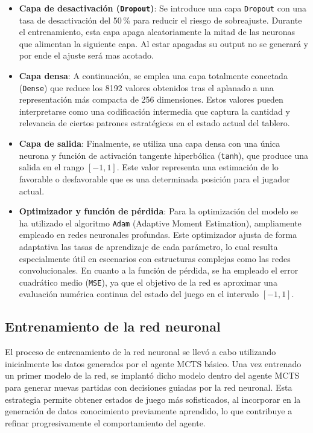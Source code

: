 \documentclass[conference]{IEEEtran}
\begin{document}
\begin{itemize}
\item \textbf{Capa de desactivación (\texttt{Dropout})}: Se introduce una capa \texttt{Dropout} con una tasa de desactivación del 50\,\% para reducir el riesgo de sobreajuste. Durante el entrenamiento, esta capa apaga aleatoriamente la mitad de las neuronas que alimentan la siguiente capa. Al estar apagadas su output no se generará y por ende el ajuste será mas acotado.

\item \textbf{Capa densa}: A continuación, se emplea una capa totalmente conectada (\texttt{Dense}) que reduce los 8192 valores obtenidos tras el aplanado a una representación más compacta de 256 dimensiones. Estos valores pueden interpretarse como una codificación intermedia que captura la cantidad y relevancia de ciertos patrones estratégicos en el estado actual del tablero.

\item \textbf{Capa de salida}\cite{rusin2020}: Finalmente, se utiliza una capa densa con una única neurona y función de activación tangente hiperbólica (\texttt{tanh}), que produce una salida en el rango $[-1, 1]$. Este valor representa una estimación de lo favorable o desfavorable que es una determinada posición para el jugador actual.

    \item \textbf{Optimizador y función de pérdida}: Para la optimización del modelo se ha utilizado el algoritmo \texttt{Adam} (Adaptive Moment Estimation)\cite{rusin2020}, ampliamente empleado en redes neuronales profundas. Este optimizador ajusta de forma adaptativa las tasas de aprendizaje de cada parámetro, lo cual resulta especialmente útil en escenarios con estructuras complejas como las redes convolucionales. En cuanto a la función de pérdida, se ha empleado el error cuadrático medio (\texttt{MSE}), ya que el objetivo de la red es aproximar una evaluación numérica continua del estado del juego en el intervalo $[-1, 1]$.
\end{itemize}


\subsection{Entrenamiento de la red neuronal}

El proceso de entrenamiento de la red neuronal se llevó a cabo utilizando inicialmente los datos generados por el agente MCTS básico. Una vez entrenado un primer modelo de la red, se implantó dicho modelo dentro del agente MCTS para generar nuevas partidas con decisiones guiadas por la red neuronal. Esta estrategia permite obtener estados de juego más sofisticados, al incorporar en la generación de datos conocimiento previamente aprendido, lo que contribuye a refinar progresivamente el comportamiento del agente.
\end{document}
